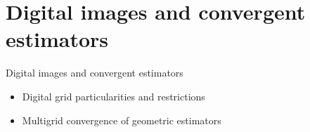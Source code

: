 \section{Digital images and convergent estimators}

\begin{frame}
\huge
\center
Digital images and convergent estimators
\vspace{2em}

\begin{minipage}{0.7\textwidth}
\normalsize
\center
\begin{itemize}
\item{Digital grid particularities and restrictions}
\item{Multigrid convergence of geometric estimators}
\end{itemize}
\end{minipage}

\end{frame}

